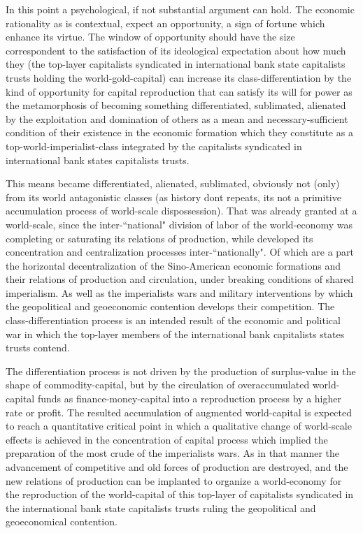 \documentclass[
]{article}
\begin{document}
In this point a psychological, if not substantial argument can hold. The
economic rationality as is contextual, expect an opportunity, a sign of
fortune which enhance its virtue. The window of opportunity should have
the size correspondent to the satisfaction of its ideological
expectation about how much they (the top-layer capitalists syndicated in
international bank state capitalists trusts holding the
world-gold-capital) can increase its class-differentiation by the kind
of opportunity for capital reproduction that can satisfy its will for
power as the metamorphosis of becoming something differentiated,
sublimated, alienated by the exploitation and domination of others as a
mean and necessary-sufficient condition of their existence in the
economic formation which they constitute as a
top-world-imperialist-class integrated by the capitalists syndicated in
international bank states capitalists trusts.

This means became differentiated, alienated, sublimated, obviously not
(only) from its world antagonistic classes (as history
don\textquotesingle t repeats, its not a primitive accumulation process
of world-scale dispossession). That was already granted at a
world-scale, since the inter-``national" division of labor of the
world-economy was completing or saturating its relations of production,
while developed its concentration and centralization processes
inter-``nationally". Of which are a part the horizontal decentralization
of the Sino-American economic formations and their relations of
production and circulation, under breaking conditions of shared
imperialism. As well as the imperialists wars and military interventions
by which the geopolitical and geoeconomic contention develops their
competition. The class-differentiation process is an intended result of
the economic and political war in which the top-layer members of the
international bank capitalists states trusts contend.

The differentiation process is not driven by the production of
surplus-value in the shape of commodity-capital, but by the circulation
of overaccumulated world-capital funds as finance-money-capital into a
reproduction process by a higher rate or profit. The resulted
accumulation of augmented world-capital is expected to reach a
quantitative critical point in which a qualitative change of world-scale
effects is achieved in the concentration of capital process which
implied the preparation of the most crude of the imperialists wars. As
in that manner the advancement of competitive and old forces of
production are destroyed, and the new relations of production can be
implanted to organize a world-economy for the reproduction of the
world-capital of this top-layer of capitalists syndicated in the
international bank state capitalists trusts ruling the geopolitical and
geoeconomical contention.
\end{document}
